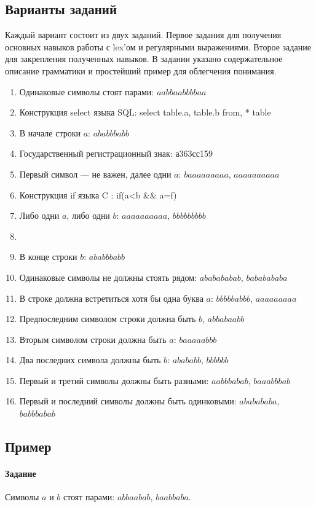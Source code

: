 \documentclass[a4paper,12pt]{article}
\begin{document}
\subsection{Варианты заданий}
Каждый вариант состоит из двух заданий. Первое задания для получения основных навыков работы с lex'ом и регулярными выражениями. Второе задание для закрепления полученных навыков. В задании указано содержательное описание грамматики и простейший пример для облегчения понимания.
\begin{enumerate}
	\item Одинаковые символы стоят парами: $aabbaabbbbaa$
	\item Конструкция select языка SQL: select table.a, table.b from, * table

	\item В начале строки $a$: $ababbbabb$
	\item Государственный регистрационный знак: а363сс159

	\item Первый символ — не важен, далее одни $a$: $baaaaaaaaa$, $aaaaaaaaaa$
	\item Конструкция if языка C : if(a<b && a=f){}

	\item Либо одни $a$, либо одни $b$: $aaaaaaaaaa$, $bbbbbbbbb$
	\item 
	\item В конце строки $b$: $ababbbabb$
	\item Одинаковые символы не должны стоять рядом: $ababababab$, $bababababa$
	\item В строке должна встретиться хотя бы одна буква $a$: $bbbbbabbb$, $aaaaaaaaa$
	\item Предпоследним символом строки должна быть $b$, $abbabaabb$
	\item Вторым символом строки должна быть $a$: $baaaaabbb$
	\item Два последних символа должны быть $b$: $abababb$, $bbbbbb$
	\item Первый и третий символы должны быть разными: $aabbbabab$, $baaabbbab$
	\item Первый и последний символы должны быть одинковыми: $ababababa$, $babbbabab$
\end{enumerate}

\subsection{Пример}
\paragraph{Задание}
Символы $a$ и $b$ стоят парами: $abbaabab$, $baabbaba$.
\end{document}
